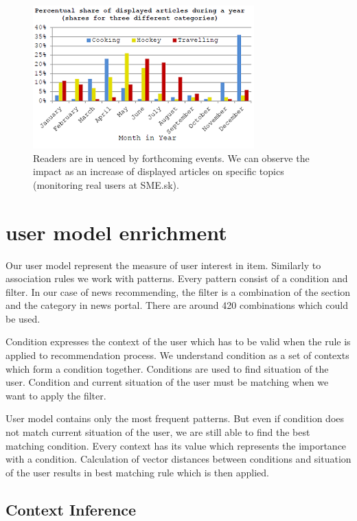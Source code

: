 \documentclass{acm_proc_article-sp} %
\begin{document}
\begin{figure}
\includegraphics{images/graf.png}
\caption{Readers are in
uenced by forthcoming
events. We can observe the impact as an increase of
displayed articles on specific topics (monitoring real
users at SME.sk).}\label{fig:1}
\end{figure}

\section{user model enrichment}

Our user model represent the measure of user interest in
item. Similarly to association rules we work with patterns.
Every pattern consist of a condition and filter. In our case
of news recommending, the filter is a combination of the
section and the category in news portal. There are around
420 combinations which could be used.

Condition expresses the context of the user which has to
be valid when the rule is applied to recommendation process.
We understand condition as a set of contexts which form a
condition together. Conditions are used to find situation of
the user. Condition and current situation of the user must
be matching when we want to apply the filter.

User model contains only the most frequent patterns. But
even if condition does not match current situation of the
user, we are still able to find the best matching condition.
Every context has its value which represents the importance
with a condition. Calculation of vector distances between
conditions and situation of the user results in best matching
rule which is then applied.

\subsection{Context Inference}
\end{document}
